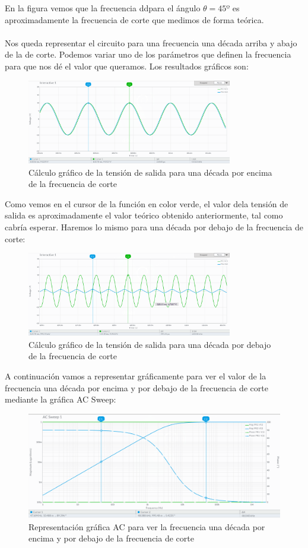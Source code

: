 \documentclass[11pt,letterpaper]{article}
\begin{document}
En la figura vemos que la frecuencia ddpara el ángulo $\theta=45º$ es aproximadamente la frecuencia de corte que medimos de forma teórica.\\
\\
Nos queda representar el circuito para una frecuencia una década arriba y abajo de la de corte. Podemos variar uno de los parámetros que definen la frecuencia para que nos dé el valor que queramos. Los resultados gráficos son:
\begin{figure}[H]
	\centering
	\includegraphics[width=0.8\textwidth]{imagen/decadaarriba.png}
	\caption{Cálculo gráfico de la tensión de salida para una década por encima de la frecuencia de corte}
	\label{fig:imagen-decadaarriba-png}
\end{figure}
Como vemos en el cursor de la función en color verde, el valor dela tensión de salida es aproximadamente el valor teórico obtenido anteriormente, tal como cabría esperar. Haremos lo mismo para una década por debajo de la frecuencia de corte:
\begin{figure}[H]
	\centering
	\includegraphics[width=0.8\textwidth]{imagen/decadaabajo.png}
	\caption{Cálculo gráfico de la tensión de salida para una década por debajo de la frecuencia de corte}
	\label{fig:}
\end{figure}
A continuación vamos a representar gráficamente para ver el valor de la frecuencia una década por encima y por debajo de la frecuencia de corte mediante la gráfica AC Sweep:
\begin{figure}[H]
	\centering
	\includegraphics[width=1\textwidth]{imagen/analisisAC.png}
	\caption{Representación gráfica AC para ver la frecuencia una década por encima y por debajo de la frecuencia de corte}
	\label{fig:imagen-accorte-png}
\end{figure}
\end{document}
